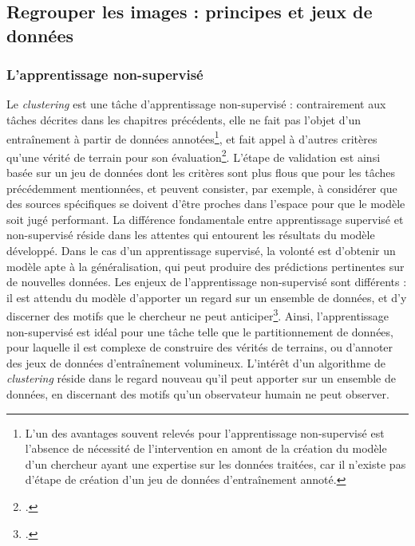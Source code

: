 
\subsection{Regrouper les images : principes et jeux de données}
    \subsubsection{L'apprentissage non-supervisé}
    Le \textit{clustering} est une tâche d'apprentissage non-supervisé : contrairement aux tâches décrites dans les chapitres précédents, elle ne fait pas l'objet d'un entraînement à partir de données annotées\footnote{L'un des avantages souvent relevés pour l'apprentissage non-supervisé est l'absence de nécessité de l'intervention en amont de la création du modèle d'un chercheur ayant une expertise sur les données traitées, car il n'existe pas d'étape de création d'un jeu de données d'entraînement annoté.}, et fait appel à d'autres critères qu'une vérité de terrain pour son évaluation\footcite{Clustering}. L'étape de validation est ainsi basée sur un jeu de données dont les critères sont plus flous que pour les tâches précédemment mentionnées, et peuvent consister, par exemple, à considérer que des sources spécifiques se doivent d'être proches dans l'espace pour que le modèle soit jugé performant. La différence fondamentale entre apprentissage supervisé et non-supervisé réside dans les attentes qui entourent les résultats du modèle développé. Dans le cas d'un apprentissage supervisé, la volonté est d'obtenir un modèle apte à la généralisation, qui peut produire des prédictions pertinentes sur de nouvelles données. Les enjeux de l'apprentissage non-supervisé sont différents : il est attendu du modèle d'apporter un regard sur un ensemble de données, et d'y discerner des motifs que le chercheur ne peut anticiper\footcite{deluaSupervisedVsUnsupervised2021}. Ainsi, l'apprentissage non-supervisé est idéal pour une tâche telle que le partitionnement de données, pour laquelle il est complexe de construire des vérités de terrains, ou d'annoter des jeux de données d'entraînement volumineux. L'intérêt d'un algorithme de \textit{clustering} réside dans le regard nouveau qu'il peut apporter sur un ensemble de données, en discernant des motifs qu'un observateur humain ne peut observer.
    
